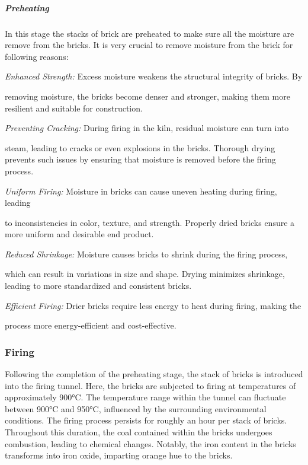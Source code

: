 \subparagraph{Preheating}
\begin{adjustwidth}{1.5em}{0em}
In this stage the stacks of brick are preheated to make sure all the moisture are remove from the bricks. It is very crucial to remove moisture from the brick for following reasons:

\vspace{0.2cm}
\textit{Enhanced Strength:}
 Excess moisture weakens the structural integrity of bricks. By \begin{adjustwidth}{1.5em}{0em}removing moisture, the bricks become denser and stronger, making them more resilient and suitable for construction.
 \vspace{0.2cm}
\end{adjustwidth}

\textit{Preventing Cracking:}
 During firing in the kiln, residual moisture can turn into \begin{adjustwidth}{1.5em}{0em}steam, leading to cracks or even explosions in the bricks. Thorough drying prevents such issues by ensuring that moisture is removed before the firing process.
\vspace{0.2cm}
\end{adjustwidth}

\textit{Uniform Firing:}
 Moisture in bricks can cause uneven heating during firing, leading \begin{adjustwidth}{1.5em}{0em}to inconsistencies in color, texture, and strength. Properly dried bricks ensure a more uniform and desirable end product.
 \vspace{0.2cm}
\end{adjustwidth}

\textit{Reduced Shrinkage:}
 Moisture causes bricks to shrink during the firing process, \begin{adjustwidth}{1.5em}{0em}which can result in variations in size and shape. Drying minimizes shrinkage, leading to more standardized and consistent bricks.
\vspace{0.2cm}
\end{adjustwidth}

\textit{Efficient Firing:} Drier bricks require less energy to heat during firing, making the \begin{adjustwidth}{1.5em}{0em}process more energy-efficient and cost-effective.
\end{adjustwidth}
\end{adjustwidth}

\subsubsection{Firing}
Following the completion of the preheating stage, the stack of bricks is introduced into the firing tunnel. Here, the bricks are subjected to firing at temperatures of approximately 900°C. The temperature range within the tunnel can fluctuate between 900°C and 950°C, influenced by the surrounding environmental conditions. The firing process persists for roughly an hour per stack of bricks. Throughout this duration, the coal contained within the bricks undergoes combustion, leading to chemical changes. Notably, the iron content in the bricks transforms into iron oxide, imparting orange hue to the bricks.

